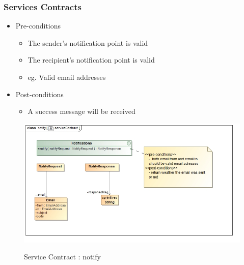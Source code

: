 \documentclass{article}
\begin{document}
		\subsubsection{Services Contracts}
			\begin{itemize}
			\item Pre-conditions
				\begin{itemize}
					\item The sender's notification point is valid
					\item The recipient's notification point is valid
					\item eg. Valid email addresses
				\end{itemize}
			\item Post-conditions
				\begin{itemize}
					\item A success message will be received 
				\end{itemize}
		\end{itemize}
		\begin{figure}[H]
		\includegraphics[width=\textwidth]{images/class__notify__serviceContract.jpg}  \\
		\caption{Service Contract : notify}
		\end{figure}


\end{document}
